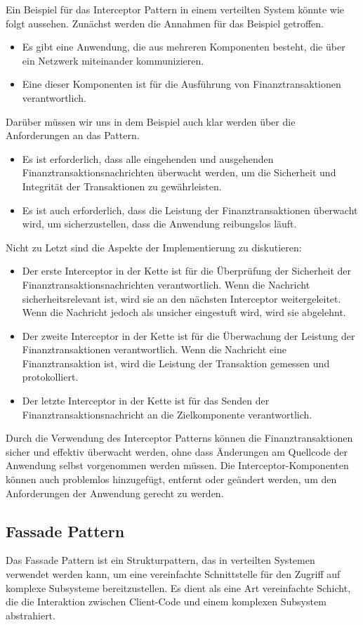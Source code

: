 \documentclass[../vs-script-first-v01.tex]{subfiles}
\begin{document}
Ein Beispiel für das Interceptor Pattern in einem verteilten System könnte wie folgt aussehen. Zunächst werden die Annahmen für das Beispiel getroffen. 
\begin{itemize}   
\item Es gibt eine Anwendung, die aus mehreren Komponenten besteht, die über ein Netzwerk miteinander kommunizieren.
\item Eine dieser Komponenten ist für die Ausführung von Finanztransaktionen verantwortlich.
\end{itemize}   
Darüber müssen wir uns in dem Beispiel auch klar werden über die Anforderungen an das Pattern.
\begin{itemize}   
\item Es ist erforderlich, dass alle eingehenden und ausgehenden Finanztransaktionsnachrichten überwacht werden, um die Sicherheit und Integrität der Transaktionen zu gewährleisten.
\item Es ist auch erforderlich, dass die Leistung der Finanztransaktionen überwacht wird, um sicherzustellen, dass die Anwendung reibungslos läuft.
\end{itemize}   
Nicht zu Letzt sind die Aspekte der Implementierung zu diskutieren:
\begin{itemize}   
\item Der erste Interceptor in der Kette ist für die Überprüfung der Sicherheit der Finanztransaktionsnachrichten verantwortlich. Wenn die Nachricht sicherheitsrelevant ist, wird sie an den nächsten Interceptor weitergeleitet. Wenn die Nachricht jedoch als unsicher eingestuft wird, wird sie abgelehnt.
\item Der zweite Interceptor in der Kette ist für die Überwachung der Leistung der Finanztransaktionen verantwortlich. Wenn die Nachricht eine Finanztransaktion ist, wird die Leistung der Transaktion gemessen und protokolliert.
\item Der letzte Interceptor in der Kette ist für das Senden der Finanztransaktionsnachricht an die Zielkomponente verantwortlich.
\end{itemize} 
Durch die Verwendung des Interceptor Patterns können die Finanztransaktionen sicher und effektiv überwacht werden, ohne dass Änderungen am Quellcode der Anwendung selbst vorgenommen werden müssen. Die Interceptor-Komponenten können auch problemlos hinzugefügt, entfernt oder geändert werden, um den Anforderungen der Anwendung gerecht zu werden.

\subsection{Fassade Pattern}
Das Fassade Pattern ist ein Strukturpattern, das in verteilten Systemen verwendet werden kann, um eine vereinfachte Schnittstelle für den Zugriff auf komplexe Subsysteme bereitzustellen. Es dient als eine Art vereinfachte Schicht, die die Interaktion zwischen Client-Code und einem komplexen Subsystem abstrahiert.
\end{document}
